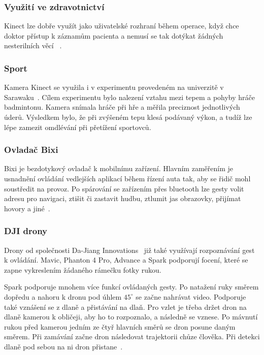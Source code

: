 \subsubsection{Využití ve zdravotnictví}
Kinect lze dobře využít jako uživatelské rozhraní během operace, když chce doktor přístup k záznamům pacienta a nemusí se tak dotýkat žádných nesterilních věcí ~\cite{24}.\\

\subsubsection{Sport}
Kamera Kinect se využila i v experimentu provedeném na univerzitě v Sarawaku~\cite{22}. Cílem experimentu bylo nalezení vztahu mezi tepem a pohyby hráče badmintonu. Kamera snímala hráče při hře a měřila preciznost jednotlivých úderů. Výsledkem bylo, že při zvýšeném tepu klesá podávaný výkon, a tudíž lze lépe zamezit omdlévání při přetížení sportovců.

\subsubsection{Ovladač Bixi}
Bixi je bezdotykový ovladač k mobilnímu zařízení. Hlavním zaměřením je usnadnění ovládání vedlejších aplikací během řízení auta tak, aby se řidič mohl soustředit na provoz. Po spárování se zařízením přes bluetooth lze gesty volit adresu pro navigaci, ztišit či zastavit hudbu, ztlumit jas obrazovky, přijímat hovory a jiné~\cite{bixi}.

\subsubsection{DJI drony}
Drony od společnosti Da-Jiang Innovations~\cite{dji} již také využívají rozpoznávání gest k ovládání. Mavic, Phanton 4 Pro, Advance  a Spark podporují focení, které se zapne vykreslením žádaného rámečku fotky rukou.

Spark podporuje mnohem více funkcí ovládaných gesty. Po natažení ruky směrem dopředu a nahoru k dronu pod úhlem $ 45^\circ $ se začne nahrávat video. Podporuje také vznášení se z dlaně a přistávání na dlaň. Pro vzlet je třeba držet dron na dlaně kamerou k obličeji, aby ho to rozpoznalo, a následně se vznese. Po mávnutí rukou před kamerou jedním ze čtyř hlavních směrů se dron posune daným směrem. Při zamávání začne dron následovat trajektorii chůze člověka. Při detekci dlaně pod sebou na ni dron přistane~\cite{heliguy}.

\endinput
